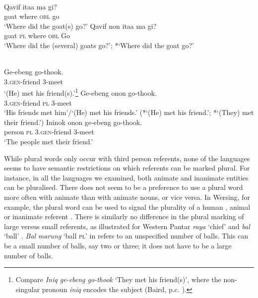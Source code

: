 \ea
{} \\
\label{bkm:Ref334184518}
\ea
\gll  Qavif ita{{\textglotstop}}{a} ma gi? \\
 goat where \textsc{obl} go \\
\glt `Where did the goat(s) go?'
\ex
\gll Qavif non ita{{\textglotstop}}a  ma gi? \\
 goat \textsc{pl} where \textsc{obl} Go \\
\glt `Where did the (several) goats go?';  *`Where did the goat go?'
\z
\z

\ea\label{bkm:Ref354060976}
 \\
  \ea
  \gll Ge-ebeng go-thook. \\
  3.\textsc{gen}-friend 3-meet \\
\glt `(He) met his friend(s).'\footnote{Compare \textit{Iniq ge-ebeng go-thook} `They met his friend(s)', where the non-singular pronoun \textit{iniq} encodes the subject (Baird, p.c. ).}
  \ex
  \gll Ge-ebeng onon go-thook. \\
  3.\textsc{gen}-friend \textsc{pl} 3-meet \\
\glt `His friends met him'/`(He) met his friends.'
  (*`(He) met his friend.'; *`(They) met their friend.')
  \ex
  \gll Ininok onon ge-ebeng go-thook. \\
  person  \textsc{pl} 3.\textsc{gen}-friend 3-meet \\
\glt `The people met their friend.'
  \z
\z

While plural words only occur with third person referents, none of the languages seems to have semantic restrictions on which referents can be marked plural. For instance, in all the languages we examined, both animate and inanimate entities can be pluralised. There does not seem to be a preference to use a plural word more often with animate than with animate nouns, or vice versa. In Wersing, for example, the plural word can be used to signal the plurality of a human , animal  or inanimate referent . There is similarly no difference in the plural marking of large versus small referents, as illustrated for Western Pantar \textit{raya} `chief'  and \textit{bal} `ball' . \textit{Bal} \textit{marung} `ball \textsc{pl'} in  refers to an unspecified number of balls. This can be a small number of balls, say two or three; it does not have to be a large number of balls.




